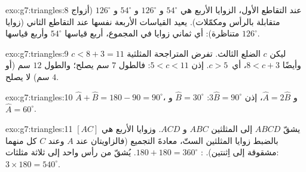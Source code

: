 \begin{solution}{exo:g7:triangles:8}
عند التقاطع الأول، الزوايا الأربع هي $54^\circ$ و $126^\circ$
و $54^\circ$ و $126^\circ$ (أزواج متقابلة بالرأس ومكمّلات).
  يعيد القياسات الأربعة نفسها عند التقاطع
الثاني (زوايا متناظرة): أي ثماني زوايا في المجموع، أربع قياسها
$54^\circ$ وأربع قياسها $126^\circ$.
\end{solution}

\begin{solution}{exo:g7:triangles:9}
ليكن $c$ الضلع الثالث. تفرض المتراجحة المثلثية
$c < 8 + 3 = 11$ وأيضًا $8 < c + 3$، أي\ $c > 5$. إذن
$5 < c < 11$: فالطول $7$ سم يصلح؛ والطول $12$ سم (أو $4$ سم)
لا يصلح.
\end{solution}

\begin{solution}{exo:g7:triangles:10}
$\widehat A + \widehat B = 180 - 90 = 90^\circ$، و
$\widehat A = 2\widehat B$، إذن $3\widehat B = 90^\circ$:
$\widehat B = 30^\circ$ و $\widehat A = 60^\circ$.
\end{solution}

\begin{solution}{exo:g7:triangles:11}
 $[AC]$ يشقّ $ABCD$ إلى المثلثين $ABC$ و $ACD$.
وزوايا  الأربع هي بالضبط زوايا المثلثين الستّ،
معادةَ التجميع (فالزاويتان عند $A$ وعند $C$ كل منهما
مشقوقة إلى اِثنتين). : $180 + 180 = 360^\circ$.  يُشقّ من
رأس واحد إلى ثلاثة مثلثات: $3 \times 180 = 540^\circ$.
\end{solution}

